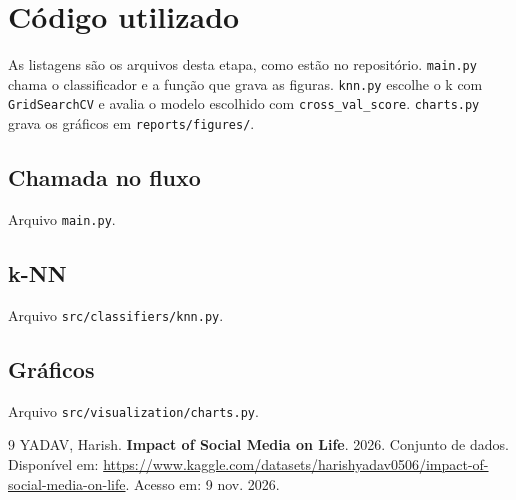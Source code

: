 \documentclass[
  article,
  12pt,
  oneside,
  a4paper,
  english,
  brazil,
  chapter=TITLE,
  section=TITLE,
  subsection=TITLE
]{abntex2}
\begin{document}
\FloatBarrier

\section{Código utilizado}

As listagens são os arquivos desta etapa, como estão no repositório. \texttt{main.py} chama o classificador e a função que grava as figuras. \texttt{knn.py} escolhe o k com \texttt{GridSearchCV} e avalia o modelo escolhido com \texttt{cross\_val\_score}. \texttt{charts.py} grava os gráficos em \texttt{reports/figures/}.

\subsection{Chamada no fluxo}

Arquivo \texttt{main.py}.



\subsection{k-NN}

Arquivo \texttt{src/classifiers/}\allowbreak\texttt{knn.py}.



\subsection{Gráficos}

Arquivo \texttt{src/visualization/}\allowbreak\texttt{charts.py}.



\postextual

\begin{thebibliography}{9}
YADAV, Harish. \textbf{Impact of Social Media on Life}. 2026. Conjunto de dados. Disponível em: \url{https://www.kaggle.com/datasets/harishyadav0506/impact-of-social-media-on-life}. Acesso em: 9 nov. 2026.
\end{thebibliography}
\end{document}
